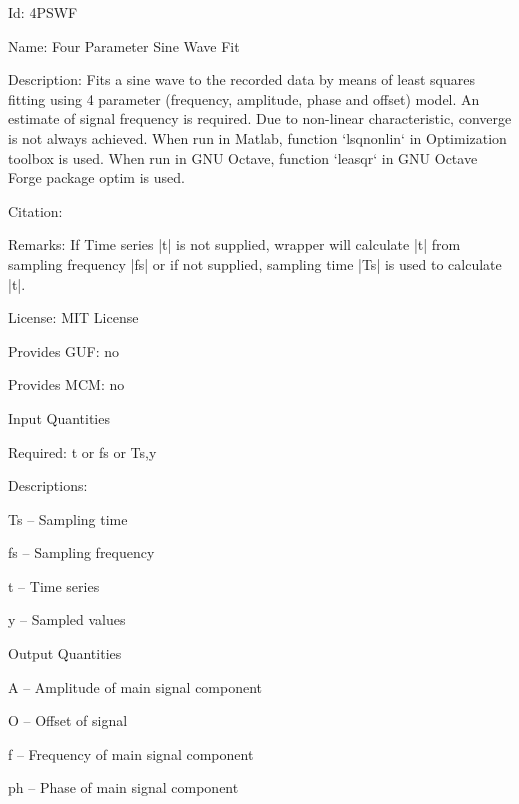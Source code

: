 \begin{tightdesc}
\item [Id:] 4PSWF
\item [Name:] Four Parameter Sine Wave Fit
\item [Description:] Fits a sine wave to the recorded data by means of least squares fitting using 4 parameter (frequency, amplitude, phase and offset) model. An estimate of signal frequency is required. Due to non-linear characteristic, converge is not always achieved. When run in Matlab, function `lsqnonlin` in Optimization toolbox is used. When run in GNU Octave, function `leasqr` in GNU Octave Forge package optim is used.
\item [Citation:] 
\item [Remarks:] If Time series |t| is not supplied, wrapper will calculate |t| from sampling frequency |fs| or if not supplied, sampling time |Ts| is used to calculate |t|.
\item [License:] MIT License
\item [Provides GUF:] no
\item [Provides MCM:] no
\item [Input Quantities] \rule{0em}{0em}
    \begin{tightdesc}
    \item [Required:] 
        \textsf{t} or \textsf{fs} or \textsf{Ts},\enspace \textsf{y}
    \end{tightdesc}
\item [Descriptions:] \rule{0em}{0em}
    \begin{tightdesc}
        \item[\textsf{Ts}] -- Sampling time
        \item[\textsf{fs}] -- Sampling frequency
        \item[\textsf{t}] -- Time series
        \item[\textsf{y}] -- Sampled values
    \end{tightdesc}
\item [Output Quantities] \rule{0em}{0em}
    \begin{tightdesc}
        \item[\textsf{A}] -- Amplitude of main signal component
        \item[\textsf{O}] -- Offset of signal
        \item[\textsf{f}] -- Frequency of main signal component
        \item[\textsf{ph}] -- Phase of main signal component
    \end{tightdesc}
\end{tightdesc}
